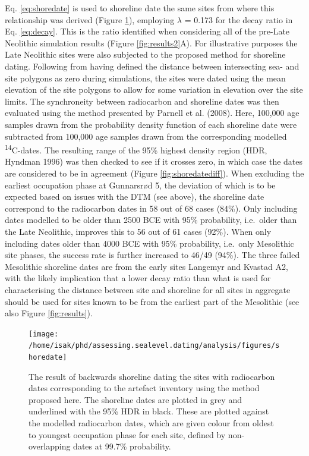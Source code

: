 \documentclass[
]{article}
\begin{document}
Eq. \eqref{eq:shoredate} is used to shoreline date the same sites from where this relationship was derived (Figure \ref{fig:shoredate}), employing \(\lambda\) = 0.173 for the decay ratio in Eq. \eqref{eq:decay}. This is the ratio identified when considering all of the pre-Late Neolithic simulation results (Figure \ref{fig:results2}A). For illustrative purposes the Late Neolithic sites were also subjected to the proposed method for shoreline dating. Following from having defined the distance between intersecting sea- and site polygons as zero during simulations, the sites were dated using the mean elevation of the site polygons to allow for some variation in elevation over the site limits. The synchroneity between radiocarbon and shoreline dates was then evaluated using the method presented by Parnell et al. (2008). Here, 100,000 age samples drawn from the probability density function of each shoreline date were subtracted from 100,000 age samples drawn from the corresponding modelled \textsuperscript{14}C-dates. The resulting range of the 95\% highest density region (HDR, Hyndman 1996) was then checked to see if it crosses zero, in which case the dates are considered to be in agreement (Figure \ref{fig:shoredatediff}). When excluding the earliest occupation phase at Gunnarsrød 5, the deviation of which is to be expected based on issues with the DTM (see above), the shoreline date correspond to the radiocarbon dates in 58 out of 68 cases (84\%). Only including dates modelled to be older than 2500 BCE with 95\% probability, i.e.~older than the Late Neolithic, improves this to 56 out of 61 cases (92\%). When only including dates older than 4000 BCE with 95\% probability, i.e.~only Mesolithic site phases, the success rate is further increased to 46/49 (94\%). The three failed Mesolithic shoreline dates are from the early sites Langemyr and Kvastad A2, with the likely implication that a lower decay ratio than what is used for characterising the distance between site and shoreline for all sites in aggregate should be used for sites known to be from the earliest part of the Mesolithic (see also Figure \ref{fig:results}).

\begin{figure}

{\centering \texttt{[image: /home/isak/phd/assessing.sealevel.dating/analysis/figures/shoredate]} 

}

\caption{The result of backwards shoreline dating the sites with radiocarbon dates corresponding to the artefact inventory using the method proposed here. The shoreline dates are plotted in grey and underlined with the 95\% HDR in black. These are plotted against the modelled radiocarbon dates, which are given colour from oldest to youngest occupation phase for each site, defined by non-overlapping dates at 99.7\% probability.}\label{fig:shoredate}
\end{figure}
\end{document}
